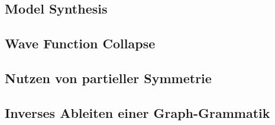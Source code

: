 \subsection{Model Synthesis}

\subsection{Wave Function Collapse}

\subsection{Nutzen von partieller Symmetrie}

\subsection{Inverses Ableiten einer Graph-Grammatik}
